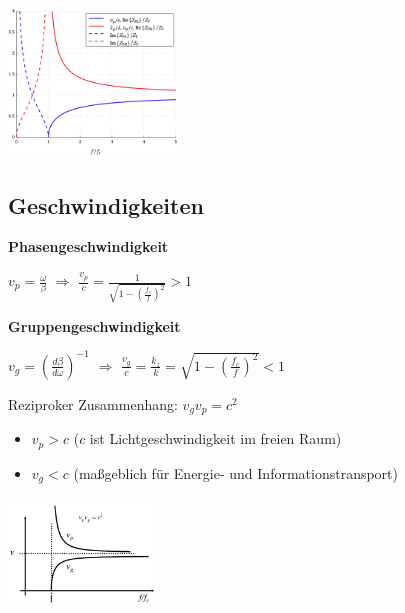 \documentclass[english]{latex4ei/latex4ei_sheet}
\begin{document}
\begin{sectionbox}
    \begin{center}\includegraphics[width = 4.5cm]{./img/hl-widerstand.png}\end{center}
\end{sectionbox}

\begin{sectionbox}
    \subsection{Geschwindigkeiten}
    \textbf{Phasengeschwindigkeit}
    \begin{emphbox}
        $v_{p}=\frac{\omega}{\beta}$ $\Rightarrow$ $\frac{v_p}{c} = \frac{1}{\sqrt{1 - \left(\frac{f_c}{f}\right)^2}} > 1$\\
    \end{emphbox}


    \textbf{Gruppengeschwindigkeit}
    \begin{emphbox}
        $v_{g}= \left(\frac{d \beta}{d \omega}\right)^{-1}$ $\Rightarrow$ $\frac{v_g}{c} = \frac{k_z}{k} = \sqrt{1-\left(\frac{f_c}{f}\right)^2} < 1$\\
    \end{emphbox}
    Reziproker Zusammenhang: $v_g v_p = c^2$\\

    \begin{itemize}
        \item $v_p > c$ ($c$ ist Lichtgeschwindigkeit im freien Raum)
        \item $v_g < c$ (maßgeblich für Energie- und Informationstransport)
    \end{itemize}
    \begin{center}\includegraphics[width = 4cm]{./img/geschwindigkeiten.png}\end{center}
\end{sectionbox}
\end{document}
